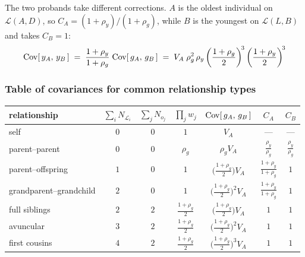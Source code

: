 \documentclass[12pt]{article}
\renewcommand{\Lin}{\mathcal{L}}
\begin{document}
The two probands take different corrections.
$A$ is the oldest individual on $\Lin(A,D)$, so $C_A = (1+\rho_y)/(1+\rho_g)$, while $B$ is the youngest on $\Lin(L,B)$ and takes $C_B = 1$:
\begin{equation*}
    \mathrm{Cov}[\,y_A,\, y_B\,] \;=\; \frac{1+\rho_y}{1+\rho_g}\; \mathrm{Cov}[\,g_A,\, g_B\,]
    \;=\; V_A\; \rho_g^2\, \rho_y
    \left(\frac{1+\rho_g}{2}\right)^{\!3}
    \left(\frac{1+\rho_y}{2}\right)^{\!3}
\end{equation*}

\subsubsection{Table of covariances for common relationship types}

\begin{table}[H]
    \begin{floatcard}
    \renewcommand{\arraystretch}{2.1}
    \setlength{\tabcolsep}{4pt}
    \scriptsize
    \begin{tabular}{l|cc|c|c|cc}
        relationship
            & $\displaystyle\sum_i N_{\Lin_i}$
            & $\displaystyle\sum_j N_{o_j}$
            & $\prod_j w_j$
            & $\mathrm{Cov}[\,g_A,\, g_B\,]$
            & $C_A$ & $C_B$ \\
        \hline
        self
            & $0$ & $0$ & $1$ & $V_A$
            & --- & --- \\
        parent--parent
            & $0$ & $0$ & $\rho_g$ & $\rho_g V_A$
            & $\tfrac{\rho_y}{\rho_g}$ & $\tfrac{\rho_y}{\rho_g}$ \\
        parent--offspring
            & $1$ & $0$ & $1$
            & $\big(\tfrac{1+\rho_g}{2}\big) V_A$
            & $\tfrac{1+\rho_y}{1+\rho_g}$ & $1$ \\
        grandparent--grandchild
            & $2$ & $0$ & $1$
            & $\big(\tfrac{1+\rho_g}{2}\big)^{2} V_A$
            & $\tfrac{1+\rho_y}{1+\rho_g}$ & $1$ \\
        full siblings
            & $2$ & $2$ & $\tfrac{1+\rho_g}{2}$
            & $\big(\tfrac{1+\rho_g}{2}\big) V_A$
            & $1$ & $1$ \\
        avuncular
            & $3$ & $2$ & $\tfrac{1+\rho_g}{2}$
            & $\big(\tfrac{1+\rho_g}{2}\big)^{2} V_A$
            & $1$ & $1$ \\
        first cousins
            & $4$ & $2$ & $\tfrac{1+\rho_g}{2}$
            & $\big(\tfrac{1+\rho_g}{2}\big)^{3} V_A$
            & $1$ & $1$ \\

\end{tabular}
\end{floatcard}
\end{table}
\end{document}
